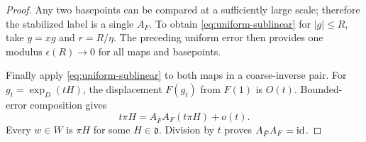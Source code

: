\begin{proof}
Any two basepoints can be compared at a sufficiently large scale;
therefore the stabilized label is a single $A_F$.
To obtain \eqref{eq:uniform-sublinear} for $|g|\le R$, take
$y=xg$ and $r=R/\eta$.  The preceding uniform error then provides
one modulus $\epsilon(R)\to0$ for all maps and basepoints.

Finally apply \eqref{eq:uniform-sublinear} to both maps in a
coarse-inverse pair.  For $g_t=\exp_D(tH)$, the displacement
$F(g_t)$ from $F(1)$ is $O(t)$.  Bounded-error composition gives
\[
 t\pi H
 =A_{\bar F}A_F(t\pi H)+o(t).
\]
Every $w\in W$ is $\pi H$ for some $H\in\mathfrak d$.
Division by $t$ proves $A_{\bar F}A_F=\operatorname{id}$.
\end{proof}
